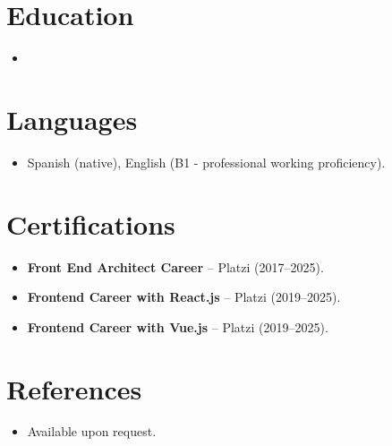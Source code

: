 \documentclass[11pt,a4paper,sans]{moderncv}
\begin{document}
\section{Education}
\vspace{1pt}
\begin{itemize}

\item{}

\end{itemize}


\section{Languages}
\vspace{1pt}
\begin{itemize}
\item Spanish (native), English (B1 - professional working proficiency).
\end{itemize}


\section{Certifications}
\vspace{1pt}
\begin{itemize}
\item{\textbf{Front End Architect Career} -- Platzi (2017--2025).}
\item{\textbf{Frontend Career with React.js} -- Platzi (2019--2025).}
\item{\textbf{Frontend Career with Vue.js} -- Platzi (2019--2025).}
\end{itemize}


\section{References}
\vspace{1pt}
\begin{itemize}
\item{Available upon request.}
\end{itemize}
\end{document}

